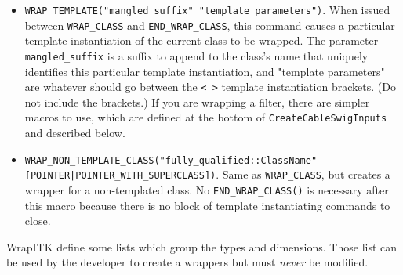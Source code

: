 \documentclass{InsightArticle}
\begin{document}
\begin{itemize}
  \item \verb$WRAP_TEMPLATE("mangled_suffix" "template parameters")$. When issued between \verb$WRAP_CLASS$
and \verb$END_WRAP_CLASS$, this command causes a particular template instantiation of
the current class to be wrapped. The parameter \verb$mangled_suffix$ is a suffix to
append to the class's name that uniquely identifies this particular template
instantiation, and "template parameters" are whatever should go between the \verb$< >$
template instantiation brackets. (Do not include the brackets.) If you are
wrapping a filter, there are simpler macros to use, which are defined at the
bottom of \verb$CreateCableSwigInputs$ and described below.

  \item \verb$WRAP_NON_TEMPLATE_CLASS("fully_qualified::ClassName" [POINTER|POINTER_WITH_SUPERCLASS])$.
Same as \verb$WRAP_CLASS$, but creates a wrapper
for a non-templated class. No \verb$END_WRAP_CLASS()$ is necessary after this macro
because there is no block of template instantiating commands to close.

\end{itemize}

WrapITK define some lists which group the types and dimensions. Those list can be used
by the developer to create a wrappers but must {\em never} be modified.
\end{document}
